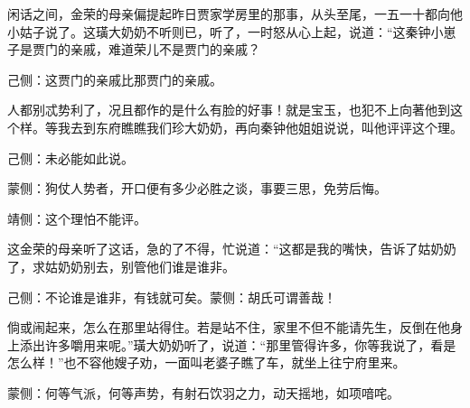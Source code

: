 \begin{parag}
    闲话之间，金荣的母亲偏提起昨日贾家学房里的那事，从头至尾，一五一十都向他小姑子说了。这璜大奶奶不听则已，听了，一时怒从心上起，说道：“这秦钟小崽子是贾门的亲戚，难道荣儿不是贾门的亲戚？\begin{note}己侧：这贾门的亲戚比那贾门的亲戚。\end{note}人都别忒势利了，况且都作的是什么有脸的好事！就是宝玉，也犯不上向著他到这个样。等我去到东府瞧瞧我们珍大奶奶，再向秦钟他姐姐说说，叫他评评这个理。\begin{note}己侧：未必能如此说。\end{note}\begin{note}蒙侧：狗仗人势者，开口便有多少必胜之谈，事要三思，免劳后悔。\end{note}\begin{note}靖侧：这个理怕不能评。\end{note}这金荣的母亲听了这话，急的了不得，忙说道：“这都是我的嘴快，告诉了姑奶奶了，求姑奶奶别去，别管他们谁是谁非。\begin{note}己侧：不论谁是谁非，有钱就可矣。蒙侧：胡氏可谓善哉！\end{note}倘或闹起来，怎么在那里站得住。若是站不住，家里不但不能请先生，反倒在他身上添出许多嚼用来呢。”璜大奶奶听了，说道：“那里管得许多，你等我说了，看是怎么样！”也不容他嫂子劝，一面叫老婆子瞧了车，就坐上往宁府里来。\begin{note}蒙侧：何等气派，何等声势，有射石饮羽之力，动天摇地，如项喑咤。\end{note}
\end{parag}


